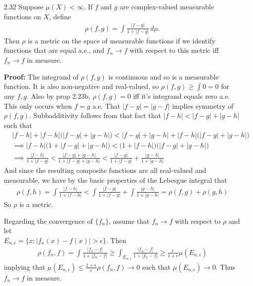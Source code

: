 \documentclass[11pt,letter]{article}
\begin{document}
\begin{enumerate}
    \item[2.32] Suppose $\mu(X) < \infty$. If $f$ and $g$ are complex-valued measurable functions on $X$, define
    \begin{align*}
        \rho(f,g) = \int \frac{|f - g|}{1 + |f - g|}\,d\mu.
    \end{align*}
    Then $\rho$ is a metric on the space of measurable functions if we identify functions that are equal a.e., and $f_n \rightarrow f$ with respect to this metric iff $f_n \rightarrow f$ in measure.

    \textbf{Proof:} The integrand of $\rho(f,g)$ is continuous and so is a measurable function. It is also non-negative and real-valued, so $\rho(f,g) \ge \int 0 = 0$ for any $f,g$. Also by prop 2.23b, $\rho(f,g) = 0 $ iff it's integrand equals zero a.e. This only occurs when $f = g$ a.e. That $|f - g| = |g - f|$ implies symmetry of $\rho(f,g)$. Subbadditivity follows from that fact that $|f - h| < |f - g| + |g - h|$ such that
    \begin{align*}
        & |f - h| + |f - h|\big(|f - g| + |g - h|\big) < |f - g| + |g - h| + |f - h|\big(|f - g| + |g - h|\big) \\ 
        & \implies |f - h| \big(1 + |f - g| + |g - h|\big) < \big(1 + |f - h|\big)\big(|f - g| + |g - h|\big) \\
        & \implies \frac{|f - h|}{1 + |f - g|} < \frac{|f - g| + |g - h|}{1 + |f - g| + |g - h|} < \frac{|f - g|}{1 + |f - g|} + \frac{|g - h|}{1 + |g - h|}
    \end{align*}
    And since the resulting composite functions are all real-valued and measurable, we have by the basic properties of the Lebesgue integral that
    \begin{align*}
        \rho(f,h) = \int \frac{|f - h|}{1 + |f - h|} < \int \frac{|f - g|}{1 + |f - g|} + \int \frac{|g - h|}{1 + |g - h|} = \rho(f,g) + \rho(g,h)
    \end{align*}
    So $\rho$ is a metric.

    Regarding the convergence of $\{f_n\}$, assume that $f_n \rightarrow f$ with respect to $\rho$ and let \\ $E_{n,\epsilon} = \{x: |f_n(x) - f(x)| > \epsilon\}$. Then
    \begin{align*}
        \rho(f_n, f) = \int \frac{|f_n - f|}{1 + |f_n - f|} \ge \int_{E_{n,\epsilon}} \frac{|f_n - f|}{1 + |f_n - f|} \ge \frac{\epsilon}{1 + \epsilon}\mu(E_{n,\epsilon})
    \end{align*}
    implying that $\mu(E_{n,\epsilon}) \le \frac{1 + \epsilon}{\epsilon}\rho(f_n,f) \rightarrow 0$ such that $\mu(E_{n,\epsilon}) \rightarrow 0$. Thus $f_n \rightarrow f$ in measure.


\end{enumerate}
\end{document}
